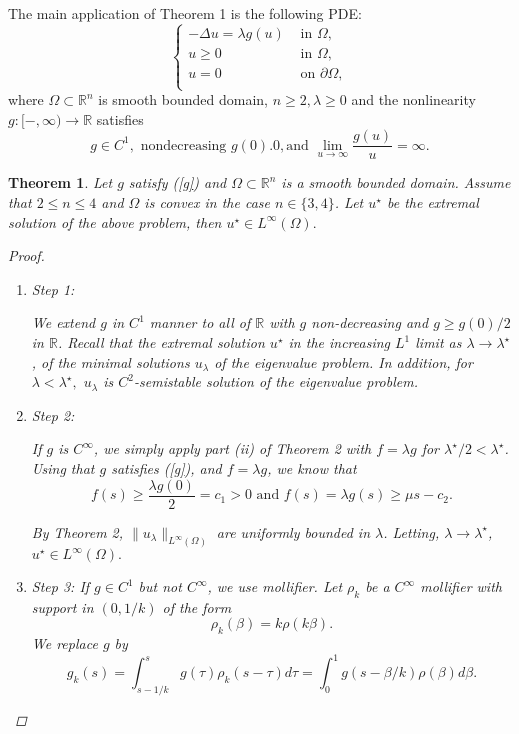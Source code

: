 \documentclass[paper=a4, fontsize=11pt]{scrartcl} %
\numberwithin{equation}{section} %
\numberwithin{figure}{section} %
\numberwithin{table}{section} %
\newtheorem{theorem}{Theorem}
\numberwithin{exercise}{section}
\begin{document}
The main application of Theorem 1 is the following PDE:
$$\begin{cases} -\Delta u=\lambda g(u) & \mbox{ in } \Omega,\\
u\geq 0 &\mbox{ in } \Omega,\\
u= 0 &\mbox{ on } \partial\Omega,\\
\end{cases}$$
where $\Omega\subset\mathbb{R}^n$ is smooth bounded domain, $n\geq 2, \lambda\geq 0$ and the nonlinearity $g\colon[-,\infty) \to\mathbb{R}$ satisfies 
\begin{equation}\label{g}
g\in C^1, \mbox{ nondecreasing } g(0).0, \mbox {and } \lim_{u\to\infty}\frac{g(u)}{u}=\infty.
\end{equation}
\begin{theorem}
Let $g$ satisfy (\ref{g}) and $\Omega\subset\mathbb{R}^n$ is a smooth bounded domain. Assume that $2\leq n\leq 4$ and $\Omega$ is convex in the case $n\in\{3,4\}$. Let $u^{\star}$ be the extremal solution of the above problem, then $u^{\star}\in L^\infty(\Omega).$
\begin{proof}
\begin{enumerate}
\item \emph{Step 1: } 

We extend $g$ in $C^1$ manner to all of $\mathbb{R}$ with $g$ non-decreasing and $g\geq g(0)/2$ in $\mathbb{R}$. Recall that the extremal solution $u^{\star}$ in the increasing $L^1$ limit as $\lambda\to\lambda^{\star}$, of the minimal solutions $u_\lambda$ of the eigenvalue problem. In addition, for $\lambda<\lambda^{\star},$ $u_\lambda$ is $C^2$-semistable solution of the eigenvalue problem.

\item \emph{Step 2:}

If $g$ is $C^\infty$, we simply apply part (ii) of Theorem 2 with $f=\lambda g$ for $\lambda^{\star}/2<\lambda^{\star}$. Using that $g$ satisfies (\ref{g}), and $f=\lambda g$, we know that $$f(s)\geq \frac{\lambda g(0)}{2}=c_1>0 \mbox{ and } f(s)=\lambda g(s) \geq \mu s-c_2.$$

By Theorem 2, $\|u_\lambda\|_{L^{\infty}(\Omega)}$  are uniformly bounded in $\lambda$. Letting, $\lambda\to\lambda^{\star}$, $u^{\star}\in L^{\infty}(\Omega).$

\item \emph{Step 3:}
If $g\in C^1$ but not $C^\infty$, we use mollifier. Let $\rho_k$ be a $C^\infty$ mollifier with support in $(0,1/k)$ of the form 
$$\rho_k(\beta)=k\rho(k\beta).$$
We replace $g$ by 
$$g_k(s)=\int_{s-1/k}^s g(\tau)\rho_k(s-\tau) d\tau =\int _{0}^1 g(s-\beta/k)\rho (\beta) d\beta.$$


\end{enumerate}
\end{proof}
\end{theorem}
\end{document}
